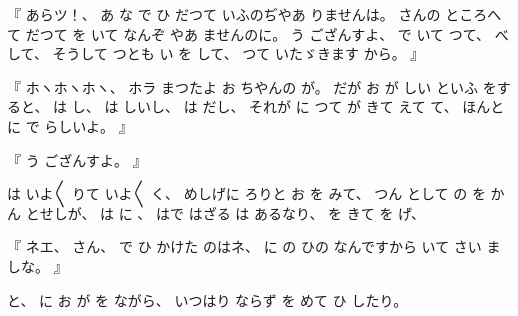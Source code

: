 %
『
あらツ！、
%
あ
な
で
ひ
だつて
いふのぢやあ
りませんは。
%
さんの
ところへ
て
だつて
を
いて
なんぞ
やあ
ませんのに。
%
う
ござんすよ、
%
で
いて
つて、
%
べ
して、
%
そうして
つとも
い
を
して、
%
つて
いたゞきます
から。
』

%
『
ホヽホヽホヽ、
%
ホラ
まつたよ
お
ちやんの
が。
%
だが
お
が
しい
といふ
をすると、
%
は
し、
%
は
しいし、
%
は
だし、
%
それが
に
つて
が
きて
えて
て、
%
ほんとに
で
らしいよ。
』

%
『
う
ござんすよ。
』

%
は
いよ〳〵
りて
いよ〳〵
く、
%
めしげに
ろりと%
お
を
みて、
%
つん
として
の
を
かん
とせしが、
%
は
に
、
%
はで
はざる
は
あるなり、
%
を
きて
を
げ、

%
『
ネエ、
%
さん、
%
で
ひ
かけた
のはネ、
%
に
の
ひの
なんですから
いて
さい
ましな。
』

%
と、
%
に
お
が
を
ながら、
%
いつはり
ならず
を
めて
ひ
したり。

